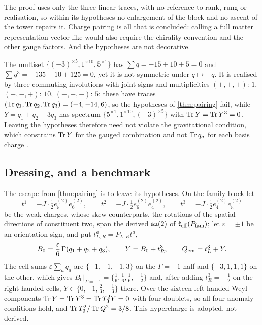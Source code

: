 The proof uses only the three linear traces, with no reference to rank, rung or realisation, so within its hypotheses no
enlargement of the block and no ascent of the tower repairs it. Charge pairing is all that is concluded: calling a full matter
representation vector-like would also require the chirality convention and the other gauge factors. And the hypotheses are not
decorative.

\begin{example}
\label{ex:multiset}
The multiset $\{(-3)^{\times5},1^{\times10},5^{\times1}\}$ has $\sum q=-15+10+5=0$ and $\sum q^3=-135+10+125=0$, yet it is not symmetric under
$q\mapsto-q$. It is realised by three commuting involutions with joint signs and multiplicities $(+,+,+){:}\,1$, $(-,-,+){:}\,10$,
$(+,-,-){:}\,5$: these have traces $(\operatorname{Tr} q_1,\operatorname{Tr} q_2,\operatorname{Tr} q_3)=(-4,-14,6)$, so the hypotheses of \cref{thm:pairing} fail, while
$Y=q_1+q_2+3q_3$ has spectrum $\{5^{\times1},1^{\times10},(-3)^{\times5}\}$ with $\operatorname{Tr} Y=\operatorname{Tr} Y^3=0$. Leaving the hypotheses therefore need not
violate the gravitational condition, which constrains $\operatorname{Tr} Y$ for the gauged combination and not $\operatorname{Tr} q_a$ for each basis charge
\cite{AlvarezGaumeWitten,Bilal}.
\end{example}

\subsection{Dressing, and a benchmark}
\label{sec:benchmark}

The escape from \cref{thm:pairing} is to leave its hypotheses. On the family block let
\[
t^1=-J\cdot\tfrac12e^{(2)}_5e^{(2)}_6,\qquad t^2=-J\cdot\tfrac12e^{(2)}_6e^{(2)}_4,\qquad t^3=-J\cdot\tfrac12e^{(2)}_4e^{(2)}_5
\]
be the weak charges, whose skew counterparts, the rotations of the spatial directions of constituent two, span the derived $\mathfrak{su}(2)$ of
$\mathfrak k_{\rm eff}(P_{\rm fam})$; let $\varepsilon=\pm1$ be an orientation sign, and put $t^a_{L,R}=P_{L,R}t^a$,
\[
B_0=\frac\varepsilon6\,\Gamma(q_1+q_2+q_3),\qquad Y=B_0+t^3_R,\qquad Q_{\rm em}=t^3_L+Y .
\]
The cell sums $\varepsilon\sum_aq_a$ are $\{-1,-1,-1,3\}$ on the $\Gamma=-1$ half and $\{-3,1,1,1\}$ on the other, which gives
$B_0|_{\Gamma=-1}=\{\tfrac16,\tfrac16,\tfrac16,-\tfrac12\}$ and, after adding $t^3_R=\pm\tfrac12$ on the right-handed cells,
$Y\in\{0,-1,\tfrac23,-\tfrac13\}$ there. Over the sixteen left-handed Weyl components $\operatorname{Tr} Y=\operatorname{Tr} Y^3=\operatorname{Tr} T_3^2Y=0$ with four doublets, so all
four anomaly conditions hold, and $\operatorname{Tr} T_3^2/\operatorname{Tr} Q^2=3/8$. This hypercharge is adopted, not derived.

